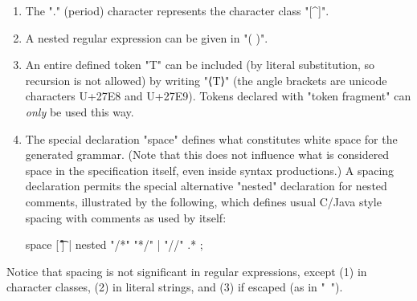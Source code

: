 \documentclass[11pt]{article} %
\begin{document}
\begin{manual}
\begin{enumerate}
  \item The "." (period) character represents the character class "[^\n]".

  \item A nested regular expression can be given in "( )".

  \item An entire defined token "T" can be included (by literal substitution, so recursion is not
    allowed) by writing "⟨T⟩" (the angle brackets are unicode characters U+27E8 and U+27E9). Tokens
    declared with "token fragment" can \emph{only} be used this way.

  \item The special declaration "space" defines what constitutes white space for the generated
    grammar. (Note that this does not influence what is considered space in the specification
    itself, even inside syntax productions.) A spacing declaration permits the special alternative
    "nested" declaration for nested comments, illustrated by the following, which defines usual
    C/Java style spacing with comments as used by \HAX itself:
\begin{hacs}[xleftmargin=\parindent]
space [ \t\f\r\n] | nested "/*" "*/" | "//" .* ;
\end{hacs}

  \end{enumerate}
  Notice that spacing is not significant in regular expressions, except (1) in character classes,
  (2) in literal strings, and (3) if escaped (as in "\ ").
\end{manual}
\end{document}
